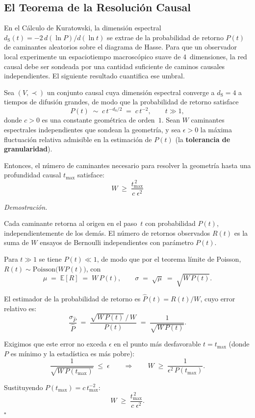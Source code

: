 \documentclass[11pt, a4paper, openany]{book}
\newcommand{\dS}{d_{\mathrm{S}}}
\renewenvironment{proof}[1][Demostraci\'on]{%
  \par\noindent\textit{#1.}\quad
}{\hfill$\square$\par\medskip}
\begin{document}
\subsection{El Teorema de la Resoluci\'on Causal}

En el C\'alculo de Kuratowski, la dimensi\'on espectral
$\dS(t) = -2\,d(\ln P)/d(\ln t)$ se extrae de la probabilidad de
retorno $P(t)$ de caminantes aleatorios sobre el diagrama de Hasse.
Para que un observador local experimente un espaciotiempo
macrosc\'opico suave de 4~dimensiones, la red causal debe ser
sondeada por una cantidad suficiente de caminos causales
independientes. El siguiente resultado cuantifica ese umbral.

\begin{theorem}
\label{thm:causal-resolution}
Sea $(V, \prec)$ un conjunto causal cuya dimensi\'on espectral
converge a $\dS = 4$ a tiempos de difusi\'on grandes, de modo que
la probabilidad de retorno satisface
\[
  P(t) \;\sim\; c\,t^{-\dS/2} \;=\; c\,t^{-2},
  \qquad t \gg 1,
\]
donde $c > 0$ es una constante geom\'etrica de orden~$1$.
Sean $W$ caminantes espectrales independientes que sondean la
geometr\'ia, y sea $\epsilon > 0$ la m\'axima fluctuaci\'on relativa
admisible en la estimaci\'on de $P(t)$ (la \textbf{tolerancia de
granularidad}).

Entonces, el n\'umero de caminantes necesario para resolver la
geometr\'ia hasta una profundidad causal $t_{\max}$ satisface:
\begin{equation}
  \boxed{\;W \;\geq\; \frac{t_{\max}^{\,2}}{c\;\epsilon^2}\;}
  \label{eq:causal-resolution}
\end{equation}
\end{theorem}

\begin{proof}
Cada caminante retorna al origen en el paso~$t$ con probabilidad
$P(t)$, independientemente de los dem\'as. El n\'umero de retornos
observados $R(t)$ es la suma de $W$ ensayos de Bernoulli
independientes con par\'ametro $P(t)$.

Para $t \gg 1$ se tiene $P(t) \ll 1$, de modo que por el teorema
l\'imite de Poisson, $R(t) \sim \mathrm{Poisson}\bigl(W P(t)\bigr)$,
con
\[
  \mu \;=\; \mathbb{E}[R] \;=\; W\,P(t),
  \qquad
  \sigma \;=\; \sqrt{\mu} \;=\; \sqrt{W\,P(t)}.
\]

El estimador de la probabilidad de retorno es
$\hat{P}(t) = R(t)/W$, cuyo error relativo es:
\[
  \frac{\sigma_{\hat{P}}}{\hat{P}}
  \;=\; \frac{\sqrt{W\,P(t)}\,/\,W}{P(t)}
  \;=\; \frac{1}{\sqrt{W\,P(t)}}.
\]

Exigimos que este error no exceda $\epsilon$ en el punto m\'as
desfavorable $t = t_{\max}$ (donde $P$ es m\'inimo y la estad\'istica
es m\'as pobre):
\[
  \frac{1}{\sqrt{W\,P(t_{\max})}} \;\leq\; \epsilon
  \qquad\Longrightarrow\qquad
  W \;\geq\; \frac{1}{\epsilon^2\,P(t_{\max})}.
\]

Sustituyendo $P(t_{\max}) = c\,t_{\max}^{-2}$:
\[
  W \;\geq\; \frac{t_{\max}^{\,2}}{c\;\epsilon^2}.
\]
\end{proof}
\end{document}
